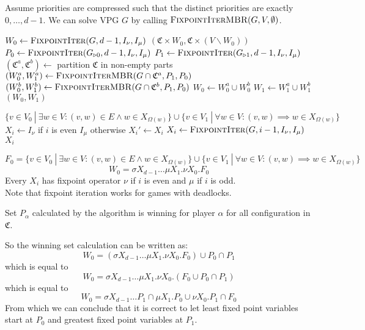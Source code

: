 \documentclass[]{article}
\begin{document}
Assume priorities are compressed such that the distinct priorities are exactly $0,\dots,d-1$. We can solve VPG $G$ by calling $\textsc{FixpointIterMBR}(G, V,\emptyset)$.
\begin{algorithm}
	\caption{$\textsc{FixpointIterMBR}(\textit{VPG }G, I_\nu, I_\mu)$}
	\begin{algorithmic}[1]
			\State $W_0 \gets \textsc{FixpointIter}(G,d-1,I_\nu,I_\mu)$
			\State \Return $(\mathfrak{C} \times W_0, \mathfrak{C} \times (V \backslash W_0))$
		\EndIf
		\State $P_0 \gets \textsc{FixpointIter}(G_{\triangleright0},d-1,I_\nu,I_\mu)$
		\State $P_1 \gets \textsc{FixpointIter}(G_{\triangleright1},d-1,I_\nu,I_\mu)$
		\State $(\mathfrak{C}^a,\mathfrak{C}^b) \gets$ partition $\mathfrak{C}$ in non-empty parts
		\State $(W_0^a, W_1^a) \gets \textsc{FixpointIterMBR}(G \cap \mathfrak{C}^a,P_1,P_0)$
		\State $(W_0^b, W_1^b) \gets \textsc{FixpointIterMBR}(G \cap \mathfrak{C}^b,P_1,P_0)$
		\State $W_0 \gets W_0^a \cup W_0^b$
		\State $W_1 \gets W_1^a \cup W_1^b$
		\State \Return $(W_0,W_1)$
	\end{algorithmic}
\end{algorithm}
\begin{algorithm}
\caption{$\textsc{FixpointIter}(\textit{PG } G, i, I_\nu, I_\mu)$}
\begin{algorithmic}[1]
		\State \Return $\{ v \in V_0\ |\ \exists w \in V: (v,w) \in E \wedge w \in X_{\Omega(w)}\}\cup \{ v \in V_1\ |\ \forall w \in V : (v,w) \implies w \in X_{\Omega(w)} \}$
	\Else
		\State $X_i \gets I_\nu$ if $i$ is even $I_\mu$ otherwise
		\Repeat
			\State $X_i' \gets X_i$
			\State $X_i \gets\textsc{FixpointIter}(G, i-1,I_\nu, I_\mu)$
		\State \Return $X_i$
	\EndIf
\end{algorithmic}
\end{algorithm}
\[ F_0 = \{ v \in V_0\ |\ \exists w \in V: (v,w) \in E \wedge w \in X_{\Omega(w)}\}\cup \{ v \in V_1\ |\ \forall w \in V : (v,w) \implies w \in X_{\Omega(w)} \} \]
\[ W_0 = \sigma X_{d-1}\dots \mu X_1. \nu X_0.F_0 \]
Every $X_i$ has fixpoint operator $\nu$ if $i$ is even and $\mu$ if $i$ is odd.\\
Note that fixpoint iteration works for games with deadlocks.

Set $P_\alpha$ calculated by the algorithm is winning for player $\alpha$ for all configuration in $\mathfrak{C}$.

So the winning set calculation can be written as:
\[ W_0 = (\sigma X_{d-1}\dots \mu X_1. \nu X_0.F_0) \cup P_0 \cap P_1 \]
which is equal to
\[ W_0 = \sigma X_{d-1}\dots \mu X_1. \nu X_0.(F_0 \cup P_0 \cap P_1)  \]
which is equal to
\[ W_0 = \sigma X_{d-1}\dots P_1 \cap \mu X_1. P_0 \cup \nu X_0.P_1 \cap F_0  \]
From which we can conclude that it is correct to let least fixed point variables start at $P_0$ and greatest fixed point variables at $P_1$.
\end{document}
